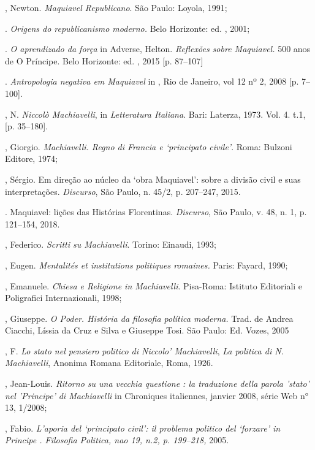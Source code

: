 \begin{bibliohedra}
, Newton. \emph{Maquiavel Republicano}. São Paulo: Loyola, 1991;

\titidem. \emph{Origens do republicanismo moderno.} Belo
Horizonte: ed. , 2001;

\titidem. \emph{O aprendizado da força} in Adverse, Helton.
\emph{Reflexões sobre Maquiavel.} 500 anos de O Príncipe. Belo
Horizonte: ed. , 2015 {[}p. 87--107{]}

\titidem. \emph{Antropologia negativa em Maquiavel} in , Rio
de Janeiro, vol 12 nº 2, 2008 {[}p. 7--100{]}.

, N. \emph{Niccolò Machiavelli}, in \emph{Letteratura
Italiana}. Bari: Laterza, 1973. Vol. 4. t.1, {[}p. 35--180{]}.

, Giorgio. \emph{Machiavelli. Regno di Francia e `principato
civile'}. Roma: Bulzoni Editore, 1974;

, Sérgio. Em direção ao núcleo da `obra Maquiavel': sobre a
divisão civil e suas interpretações. \emph{Discurso}, São Paulo, n.
45/2, p. 207--247, 2015.

\titidem. Maquiavel: lições das Histórias Florentinas.
\emph{Discurso}, São Paulo, v. 48, n. 1, p. 121--154, 2018.

, Federico. \emph{Scritti su Machiavelli}. Torino: Einaudi, 1993;

, Eugen. \emph{Mentalités et institutions politiques romaines.}
Paris: Fayard, 1990;

, Emanuele. \emph{Chiesa e Religione in Machiavelli}.
Pisa-Roma: Istituto Editoriali e Poligrafici Internazionali, 1998;

, Giuseppe. \emph{O Poder. História da filosofia política moderna.}
Trad. de Andrea Ciacchi, Líssia da Cruz e Silva e Giuseppe Tosi. São
Paulo: Ed. Vozes, 2005

, F. \emph{Lo stato nel pensiero politico di Niccolo'
Machiavelli}, \emph{La politica di N. Machiavelli}, Anonima Romana
Editoriale, Roma, 1926.

, Jean-Louis. \emph{Ritorno su una vecchia questione : la
traduzione della parola 'stato' nel 'Principe' di Machiavelli} in
Chroniques italiennes, janvier 2008, série Web n° 13, 1/2008;

, Fabio. \emph{L'aporia del `principato civil': il problema
politico del `forzare' in Principe . Filosofia Politica, nao 19, n.2,
p. 199--218,} 2005.


\end{bibliohedra}
